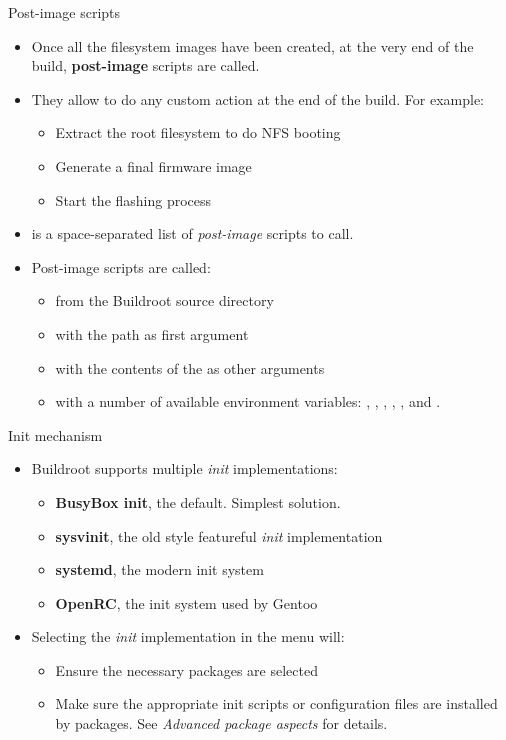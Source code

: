 \begin{frame}{Post-image scripts}
  \begin{itemize}
  \item Once all the filesystem images have been created, at the very
    end of the build, {\bf post-image} scripts are called.
  \item They allow to do any custom action at the end of the
    build. For example:
    \begin{itemize}
    \item Extract the root filesystem to do NFS booting
    \item Generate a final firmware image
    \item Start the flashing process
    \end{itemize}
  \item {} is a space-separated list
    of {\em post-image} scripts to call.
  \item Post-image scripts are called:
    \begin{itemize}
    \item from the Buildroot source directory
    \item with the  path as first argument
    \item with the contents of the  as other arguments
    \item with a number of available environment variables:
      , , ,
      , ,  and
      .
    \end{itemize}
  \end{itemize}
\end{frame}

\begin{frame}{Init mechanism}
  \begin{itemize}
  \item Buildroot supports multiple {\em init} implementations:
    \begin{itemize}
    \item {\bf BusyBox init}, the default. Simplest solution.
    \item {\bf sysvinit}, the old style featureful {\em init}
      implementation
    \item {\bf systemd}, the modern init system
    \item {\bf OpenRC}, the init system used by Gentoo
    \end{itemize}
  \item Selecting the {\em init} implementation in the  menu will:
    \begin{itemize}
    \item Ensure the necessary packages are selected
    \item Make sure the appropriate init scripts or configuration
      files are installed by packages. See {\em Advanced package
        aspects} for details.
    \end{itemize}
  \end{itemize}
\end{frame}

